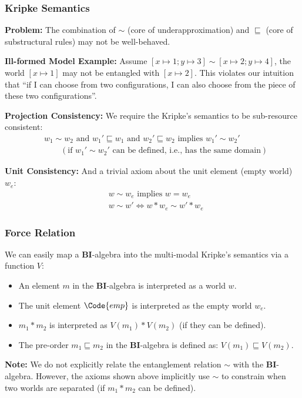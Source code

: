 \begin{frame}[fragile]
    \frametitle{Kripke Semantics}

\textbf{Problem:} The combination of $\sim$ (core of underapproximation) and $\sqsubseteq$ (core of substructural rules) may not be well-behaved.

\textbf{Ill-formed Model Example:} Assume $[x\mapsto 1; y \mapsto 3] \sim [x\mapsto 2; y \mapsto 4]$, the world $[x\mapsto 1]$ may not be entangled with $[x\mapsto 2]$. This violates our intuition that ``if I can choose from two configurations, I can also choose from the piece of these two configurations''.

\textbf{Projection Consistency:} We require the Kripke's semantics to be sub-resource consistent:
\begin{align*}
    &w_1 \sim w_2 \text{ and } w_1' \sqsubseteq w_1 \text{ and } w_2' \sqsubseteq w_2 \text{ implies } w_1' \sim w_2' 
    \\&\qquad (\text{if $w_1' \sim w_2'$ can be defined, i.e., has the same domain})
\end{align*}\noindent

\textbf{Unit Consistency:} And a trivial axiom about the unit element (empty world) $w_e$:
\begin{align*}
    &w \sim w_e \text{ implies } w = w_e
    \\&w \sim w' \iff w * w_e \sim w' * w_e
\end{align*}\noindent

\end{frame}

\begin{frame}[fragile]
    \frametitle{Force Relation}
We can easily map a \textbf{BI}-algebra into the multi-modal Kripke's semantics via a function $V$:
\begin{itemize}
    \item An element $m$ in the \textbf{BI}-algebra is interpreted as a world $w$.
    \item The unit element $\Code{emp}$ is interpreted as the empty world $w_e$.
    \item $m_1 * m_2$ is interpreted as $V(m_1) * V(m_2)$ (if they can be defined).
    \item The pre-order $m_1 \sqsubseteq m_2$ in the \textbf{BI}-algebra is defined as: $V(m_1) \sqsubseteq V(m_2)$.
\end{itemize}

\textbf{Note:} We do not explicitly relate the entanglement relation $\sim$ with the \textbf{BI}-algebra. However, the axioms shown above implicitly use $\sim$ to constrain when two worlds are separated (if $m_1 * m_2$ can be defined).

\end{frame}

